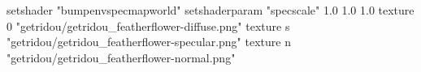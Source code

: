 setshader "bumpenvspecmapworld"
setshaderparam "specscale" 1.0 1.0 1.0
texture 0 "getridou/getridou_featherflower-diffuse.png"
texture s "getridou/getridou_featherflower-specular.png"
texture n "getridou/getridou_featherflower-normal.png"
